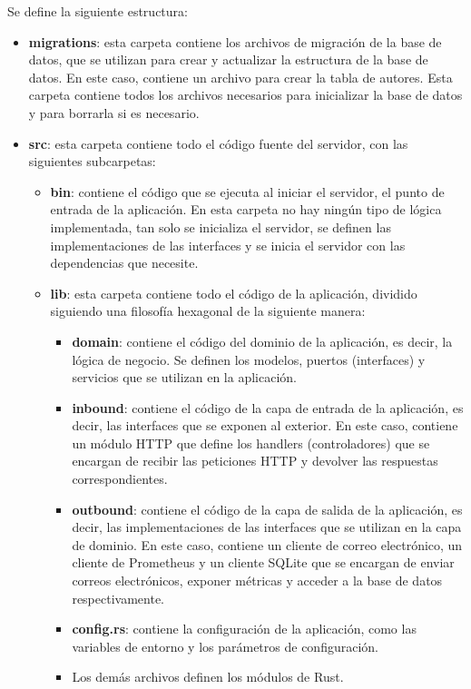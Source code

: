 Se define la siguiente estructura:
\begin{itemize}
    \item \textbf{migrations}: esta carpeta contiene los archivos de migración de la base de datos, que se utilizan para crear y actualizar la estructura de la base de datos. En este caso, contiene un archivo para crear la tabla de autores. Esta carpeta contiene todos los archivos necesarios para inicializar la base de datos y para borrarla si es necesario.
    \item \textbf{src}: esta carpeta contiene todo el código fuente del servidor, con las siguientes subcarpetas:
        \begin{itemize}
            \item \textbf{bin}: contiene el código que se ejecuta al iniciar el servidor, el punto de entrada de la aplicación. En esta carpeta no hay ningún tipo de lógica implementada, tan solo se inicializa el servidor, se definen las implementaciones de las interfaces y se inicia el servidor con las dependencias que necesite.
            \item \textbf{lib}: esta carpeta contiene todo el código de la aplicación, dividido siguiendo una filosofía hexagonal de la siguiente manera:
                \begin{itemize}
                    \item \textbf{domain}: contiene el código del dominio de la aplicación, es decir, la lógica de negocio. Se definen los modelos, puertos (interfaces) y servicios que se utilizan en la aplicación.
                    \item \textbf{inbound}: contiene el código de la capa de entrada de la aplicación, es decir, las interfaces que se exponen al exterior. En este caso, contiene un módulo HTTP que define los handlers (controladores) que se encargan de recibir las peticiones HTTP y devolver las respuestas correspondientes.
                    \item \textbf{outbound}: contiene el código de la capa de salida de la aplicación, es decir, las implementaciones de las interfaces que se utilizan en la capa de dominio. En este caso, contiene un cliente de correo electrónico, un cliente de Prometheus y un cliente SQLite que se encargan de enviar correos electrónicos, exponer métricas y acceder a la base de datos respectivamente.
                    \item \textbf{config.rs}: contiene la configuración de la aplicación, como las variables de entorno y los parámetros de configuración.
                    \item Los demás archivos definen los módulos de Rust.
                \end{itemize}
        \end{itemize}
\end{itemize}

